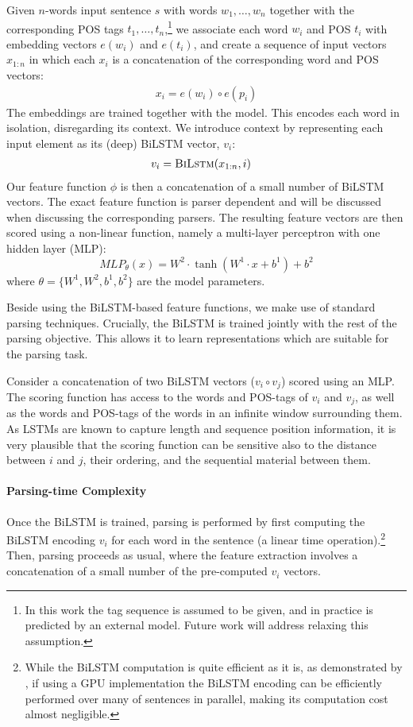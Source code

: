 \documentclass[11pt]{article}
\begin{document}
Given $n$-words input sentence $s$ with words $w_1,\dots,w_n$ together with the
corresponding POS tags $t_1,\dots,t_n$,\footnote{
In this work the tag sequence is assumed to be given, and in practice is predicted by an external model. Future work will address relaxing
this assumption.} we associate each word $w_i$ and POS $t_i$ with embedding
vectors $e(w_i)$ and $e(t_i)$, and create a sequence of input vectors
$x_{1:n}$ in which each
$x_i$ is a concatenation of the corresponding word and POS vectors:
\begin{align*}
    x_i = e(w_i) \circ e(p_i)
\end{align*}
The embeddings are trained together with the model.
This encodes each word in isolation, disregarding its context. We introduce
context by representing each input element as its (deep) \mbox{BiLSTM} vector, $v_i$:
\begin{align*}
    v_i &= \textsc{BiLstm}(x_{1:n},i)
\end{align*}
Our feature function $\phi$ is then a concatenation of a small number of
BiLSTM vectors.  The exact feature function is parser dependent and will be
discussed when discussing the corresponding parsers.  The resulting feature
vectors are then scored using a non-linear function, namely a multi-layer
perceptron with one hidden layer (MLP):
\[MLP_\theta(x) = W^2\cdot \tanh(W^1\cdot x + b^1) + b^2\]
where
$\theta=\{W^1,W^2,b^1,b^2\}$ are the model parameters.

Beside using the BiLSTM-based feature functions, we make use of standard parsing
techniques.  Crucially, the \mbox{BiLSTM} is trained jointly with the rest of the
parsing objective.  This allows it to learn representations which are suitable
for the parsing task.

Consider a concatenation of two \mbox{BiLSTM} vectors ($v_i \circ v_j$) scored using an MLP.
The scoring function has access to the words and POS-tags of $v_i$ and $v_j$, as
well as the words and POS-tags of the words in an infinite window surrounding
them.  As LSTMs are known to capture length and sequence position information, it is very
plausible that the scoring function can be sensitive also to the distance
between $i$ and $j$, their ordering, and the sequential material between them.

\paragraph{Parsing-time Complexity}
Once the \mbox{BiLSTM} is trained, parsing is performed by first computing the BiLSTM
encoding $v_i$ for each word in the sentence (a linear time operation).\footnote{
While the \mbox{BiLSTM} computation is quite efficient as it is, as demonstrated by ,
if using a GPU implementation the \mbox{BiLSTM} encoding
can be efficiently performed over many of sentences in parallel, making its computation cost
almost negligible.}
Then,
parsing proceeds as usual, where the feature extraction involves a concatenation
of a small number of the pre-computed $v_i$ vectors.
\end{document}
